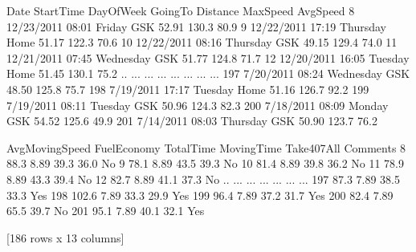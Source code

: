\documentclass[letterpaper,10pt,english]{jupyterBook}
\begin{document}
\begin{sphinxVerbatim}[commandchars=\\\{\}]
           Date StartTime  DayOfWeek GoingTo  Distance  MaxSpeed  AvgSpeed  \PYGZbs{}
8    12/23/2011     08:01     Friday     GSK     52.91     130.3      80.9   
9    12/22/2011     17:19   Thursday    Home     51.17     122.3      70.6   
10   12/22/2011     08:16   Thursday     GSK     49.15     129.4      74.0   
11   12/21/2011     07:45  Wednesday     GSK     51.77     124.8      71.7   
12   12/20/2011     16:05    Tuesday    Home     51.45     130.1      75.2   
..          ...       ...        ...     ...       ...       ...       ...   
197   7/20/2011     08:24  Wednesday     GSK     48.50     125.8      75.7   
198   7/19/2011     17:17    Tuesday    Home     51.16     126.7      92.2   
199   7/19/2011     08:11    Tuesday     GSK     50.96     124.3      82.3   
200   7/18/2011     08:09     Monday     GSK     54.52     125.6      49.9   
201   7/14/2011     08:03   Thursday     GSK     50.90     123.7      76.2   

     AvgMovingSpeed  FuelEconomy  TotalTime  MovingTime Take407All Comments  
8              88.3         8.89       39.3        36.0         No           
9              78.1         8.89       43.5        39.3         No           
10             81.4         8.89       39.8        36.2         No           
11             78.9         8.89       43.3        39.4         No           
12             82.7         8.89       41.1        37.3         No           
..              ...          ...        ...         ...        ...      ...  
197            87.3         7.89       38.5        33.3        Yes           
198           102.6         7.89       33.3        29.9        Yes           
199            96.4         7.89       37.2        31.7        Yes           
200            82.4         7.89       65.5        39.7         No           
201            95.1         7.89       40.1        32.1        Yes           

[186 rows x 13 columns]
\end{sphinxVerbatim}

\begin{sphinxVerbatim}[commandchars=\\\{\}]
  
\end{sphinxVerbatim}
\end{document}
